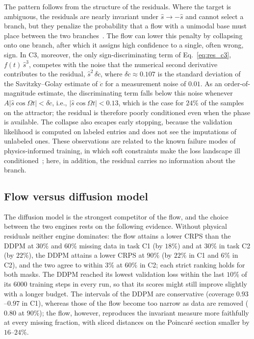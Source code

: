 The pattern follows from the structure of the residuals. Where the target is ambiguous, the residuals are nearly invariant under $\hat s\to-\hat s$ and cannot select a branch, but they penalize the probability that a flow with a unimodal base must place between the two branches~\cite{Cornish2020}. The flow can lower this penalty by collapsing onto one branch, after which it assigns high confidence to a single, often wrong, sign. In C3, moreover, the only sign-discriminating term of Eq.~\eqref{eq:res_c3}, $f(t)\,\hat s^{3}$, competes with the noise that the numerical second derivative contributes to the residual, $\hat s^{2}\,\delta\ddot c$, where $\delta\ddot c\approx0.107$ is the standard deviation of the Savitzky--Golay estimate of $\ddot c$ for a measurement noise of $0.01$. As an order-of-magnitude estimate, the discriminating term falls below this noise whenever $A|\hat s\cos\Omega t|<\delta\ddot c$, i.e., $|\hat s\cos\Omega t|<0.13$, which is the case for $24\%$ of the samples on the attractor; the residual is therefore poorly conditioned even when the phase is available. The collapse also escapes early stopping, because the validation likelihood is computed on labeled entries and does not see the imputations of unlabeled ones. These observations are related to the known failure modes of physics-informed training, in which soft constraints make the loss landscape ill conditioned~\cite{Krishnapriyan2021,WangTengPerdikaris2021}; here, in addition, the residual carries no information about the branch.

\subsection{Flow versus diffusion model}\label{sec:res_engine}

The diffusion model is the strongest competitor of the flow, and the choice between the two engines rests on the following evidence. Without physical residuals neither engine dominates: the flow attains a lower CRPS than the DDPM at $30\%$ and $60\%$ missing data in task C1 (by $18\%$) and at $30\%$ in task C2 (by $22\%$), the DDPM attains a lower CRPS at $90\%$ (by $22\%$ in C1 and $6\%$ in C2), and the two agree to within $3\%$ at $60\%$ in C2; each strict ranking holds for both masks. The DDPM reached its lowest validation loss within the last $10\%$ of its 6000 training steps in every run, so that its scores might still improve slightly with a longer budget. The intervals of the DDPM are conservative (coverage $0.93$--$0.97$ in C1), whereas those of the flow become too narrow as data are removed ($0.80$ at $90\%$); the flow, however, reproduces the invariant measure more faithfully at every missing fraction, with sliced distances on the Poincar\'e section smaller by $16$--$24\%$.

